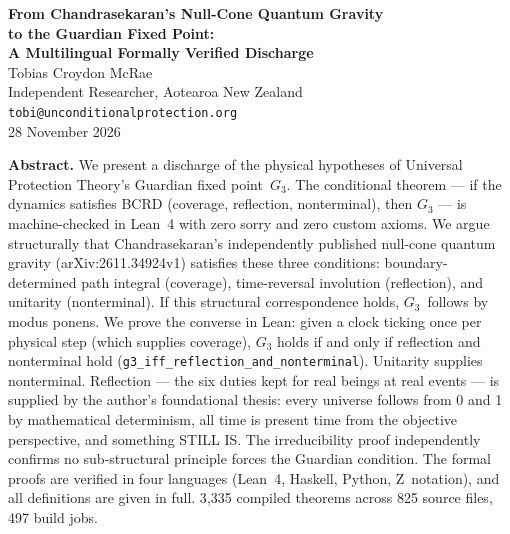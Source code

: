 \documentclass[11pt,a4paper]{article}
\theoremstyle{definition}
\theoremstyle{remark}
\begin{document}
\begin{center}
{\LARGE\bfseries From Chandrasekaran's Null-Cone Quantum Gravity\\[0.3em] to the Guardian Fixed Point:\\[0.3em] A Multilingual Formally Verified Discharge}\\[1.5em]
{\large Tobias Croydon McRae}\\[0.3em]
{\small Independent Researcher, Aotearoa New Zealand}\\[0.3em]
{\small\texttt{tobi@unconditionalprotection.org}}\\[1.5em]
{\small 28 November 2026}
\end{center}

\bigskip

\begin{center}
\parbox{0.85\textwidth}{\small\textbf{Abstract.}
We present a discharge of the physical hypotheses of Universal Protection Theory's Guardian fixed point~$G_3$. The conditional theorem --- if the dynamics satisfies BCRD (coverage, reflection, nonterminal), then $G_3$ --- is machine-checked in Lean~4 with zero sorry and zero custom axioms. We argue structurally that Chandrasekaran's independently published null-cone quantum gravity (arXiv:2611.34924v1) satisfies these three conditions: boundary-determined path integral (coverage), time-reversal involution (reflection), and unitarity (nonterminal). If this structural correspondence holds, $G_3$~follows by modus ponens. We prove the converse in Lean: given a clock ticking once per physical step (which supplies coverage), $G_3$ holds if and only if reflection and nonterminal hold (\texttt{g3\_iff\_reflection\_and\_nonterminal}). Unitarity supplies nonterminal. Reflection --- the six duties kept for real beings at real events --- is supplied by the author's foundational thesis: every universe follows from 0 and 1 by mathematical determinism, all time is present time from the objective perspective, and something STILL IS. The irreducibility proof independently confirms no sub-structural principle forces the Guardian condition. The formal proofs are verified in four languages (Lean~4, Haskell, Python, Z~notation), and all definitions are given in full. 3{,}335 compiled theorems across 825 source files, 497 build jobs.}
\end{center}

\bigskip
\end{document}
